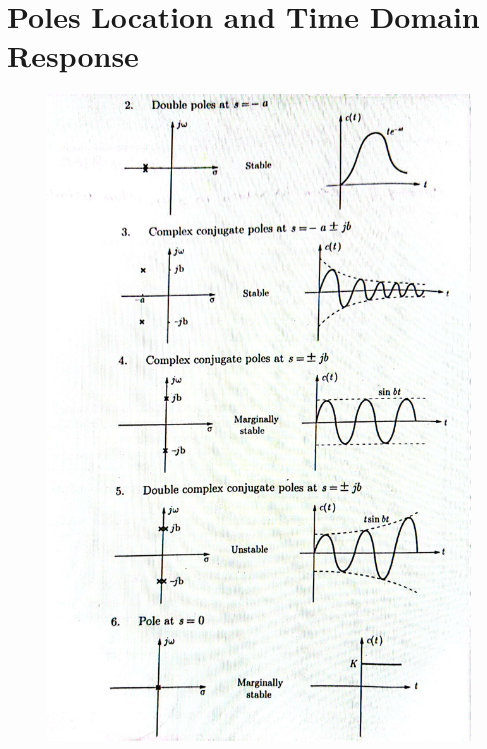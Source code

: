\section{Poles Location and Time Domain Response}

\begin{figure}
	\includegraphics[width=\linewidth]{src/laplace/lpfig1}
\end{figure}
